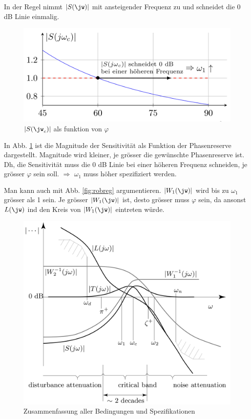         In der Regel nimmt $|S(\jw)|$ mit ansteigender Frequenz zu und schneidet die 0 dB Linie einmalig.
        
        \begin{figure}[H]
            \centering
            \includegraphics[width = 0.5\linewidth]{images/03/phasemargin.jpeg}
            \caption{$|S(\jw_c)|$ als funktion von $\varphi$}
            \label{fig:pmarg}
        \end{figure}
        
        In Abb. \ref{fig:pmarg} ist die Magnitude der Sensitivität als Funktion der Phasenreserve dargestellt. Magnitude wird kleiner, je grösser die gewünschte Phasenreserve ist. Dh, die Sensitivität muss die 0 dB Linie bei einer höheren Frequenz schneiden, je grösser $\varphi$ sein soll. $\Rightarrow$ $\omega_1$ muss höher spezifiziert werden.
        
        Man kann auch mit Abb. \ref{fig:robreg} argumentieren. $|W_1(\jw)|$ wird bis zu $\omega_1$ grösser als 1 sein. Je grösser $|W_1(\jw)|$ ist, desto grösser muss $\varphi$ sein, da ansonst $L(\jw)$ ind den Kreis von $|W_1(\jw)|$ eintreten würde.
        
        \begin{figure}[H]
            \centering
            \includegraphics[width = 0.6\linewidth]{images/03/summary_specifications.jpeg}
            \caption{Zusammenfassung aller Bedingungen und Spezifikationen}
        \end{figure}